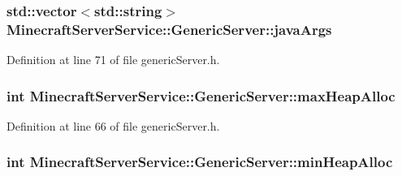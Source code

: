 \subsubsection[{\texorpdfstring{java\+Args}{javaArgs}}]{\setlength{\rightskip}{0pt plus 5cm}std\+::vector$<$std\+::string$>$ Minecraft\+Server\+Service\+::\+Generic\+Server\+::java\+Args\hspace{0.3cm}{\ttfamily [protected]}}\hypertarget{class_minecraft_server_service_1_1_generic_server_aed22e47eba34c39feb62ca62ad02dbb2}{}\label{class_minecraft_server_service_1_1_generic_server_aed22e47eba34c39feb62ca62ad02dbb2}


Definition at line 71 of file generic\+Server.\+h.

\subsubsection[{\texorpdfstring{max\+Heap\+Alloc}{maxHeapAlloc}}]{\setlength{\rightskip}{0pt plus 5cm}int Minecraft\+Server\+Service\+::\+Generic\+Server\+::max\+Heap\+Alloc\hspace{0.3cm}{\ttfamily [protected]}}\hypertarget{class_minecraft_server_service_1_1_generic_server_a025ace4dd732e9e1a3d47e695ebfabc1}{}\label{class_minecraft_server_service_1_1_generic_server_a025ace4dd732e9e1a3d47e695ebfabc1}


Definition at line 66 of file generic\+Server.\+h.

\subsubsection[{\texorpdfstring{min\+Heap\+Alloc}{minHeapAlloc}}]{\setlength{\rightskip}{0pt plus 5cm}int Minecraft\+Server\+Service\+::\+Generic\+Server\+::min\+Heap\+Alloc\hspace{0.3cm}{\ttfamily [protected]}}\hypertarget{class_minecraft_server_service_1_1_generic_server_a75978615a6ba8576a5d97664ffd85142}{}\label{class_minecraft_server_service_1_1_generic_server_a75978615a6ba8576a5d97664ffd85142}


